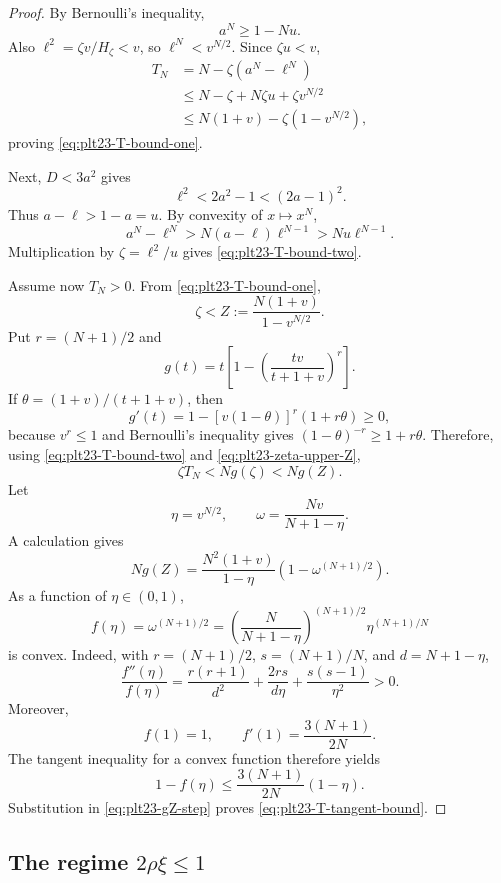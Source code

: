 \documentclass[11pt]{article}
\numberwithin{equation}{section}
\begin{document}
\begin{proof}
  By Bernoulli's inequality,
  \[
    a^N\ge1-Nu.
  \]
  Also $\ell^2=\zeta v/H_\zeta<v$, so
  $\ell^N<v^{N/2}$.  Since $\zeta u< v$,
  \begin{align*}
    T_N
    &=N-\zeta(a^N-\ell^N)\\
    &\le N-\zeta+N\zeta u+\zeta v^{N/2}\\
    &\le N(1+v)-\zeta(1-v^{N/2}),
  \end{align*}
  proving \eqref{eq:plt23-T-bound-one}.

  Next, $D<3a^2$ gives
  \[
    \ell^2<2a^2-1<(2a-1)^2.
  \]
  Thus $a-\ell>1-a=u$.  By convexity of $x\mapsto x^N$,
  \[
    a^N-\ell^N>N(a-\ell)\ell^{N-1}>Nu\ell^{N-1}.
  \]
  Multiplication by $\zeta=\ell^2/u$ gives
  \eqref{eq:plt23-T-bound-two}.

  Assume now $T_N>0$.  From \eqref{eq:plt23-T-bound-one},
  \begin{equation}\label{eq:plt23-zeta-upper-Z}
    \zeta<Z:=\frac{N(1+v)}{1-v^{N/2}}.
  \end{equation}
  Put $r=(N+1)/2$ and
  \[
    g(t)=t\left[1-
    \left(\frac{tv}{t+1+v}\right)^r\right].
  \]
  If $\theta=(1+v)/(t+1+v)$, then
  \[
    g'(t)=1-[v(1-\theta)]^r(1+r\theta)\ge0,
  \]
  because $v^r\le1$ and Bernoulli's inequality gives
  $(1-\theta)^{-r}\ge1+r\theta$.  Therefore,
  using \eqref{eq:plt23-T-bound-two} and \eqref{eq:plt23-zeta-upper-Z},
  \begin{equation}\label{eq:plt23-gZ-step}
    \zeta T_N<N g(\zeta)<Ng(Z).
  \end{equation}
  Let
  \[
    \eta=v^{N/2},
    \qquad
    \omega=\frac{Nv}{N+1-\eta}.
  \]
  A calculation gives
  \[
    Ng(Z)=
    \frac{N^2(1+v)}{1-\eta}
    \left(1-\omega^{(N+1)/2}\right).
  \]
  As a function of $\eta\in(0,1)$,
  \[
    f(\eta)=\omega^{(N+1)/2}
    =\left(\frac{N}{N+1-\eta}\right)^{(N+1)/2}
    \eta^{(N+1)/N}
  \]
  is convex.  Indeed, with
  $r=(N+1)/2$, $s=(N+1)/N$, and $d=N+1-\eta$,
  \[
    \frac{f''(\eta)}{f(\eta)}
    =\frac{r(r+1)}{d^2}
    +\frac{2rs}{d\eta}
    +\frac{s(s-1)}{\eta^2}>0.
  \]
  Moreover,
  \[
    f(1)=1,
    \qquad
    f'(1)=\frac{3(N+1)}{2N}.
  \]
  The tangent inequality for a convex function therefore yields
  \[
    1-f(\eta)
    \le\frac{3(N+1)}{2N}(1-\eta).
  \]
  Substitution in \eqref{eq:plt23-gZ-step} proves
  \eqref{eq:plt23-T-tangent-bound}.
\end{proof}

\subsection{The regime \texorpdfstring{$2\rho\xi\le1$}{2 rho xi <= 1}}\label{subsec:plt23-quadratic}
\end{document}
